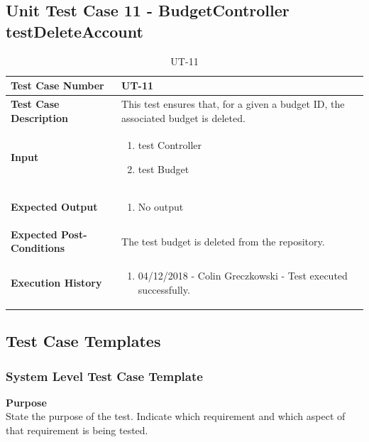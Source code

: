 \documentclass[12pt]{article}
\begin{document}
\subsection{Unit Test Case 11 - BudgetController testDeleteAccount}
\def\arraystretch{1.5}%
\begin{table}[htbp]
\centering
\caption{UT-11}
\label{UT-11}
\begin{tabularx}{\textwidth}{ | l | X |}
\hline
\textbf{Test Case Number}      		&  UT-11                 			\\ \hline
\textbf{Test Case Description}    	&  This test ensures that, for a given a budget ID, the associated budget is deleted. 				\\ \hline
\textbf{Input}         			& 	\begin{enumerate}
								\item test Controller
								\item test Budget
							\end{enumerate} 		\\ \hline
\textbf{Expected Output}     		& 	\begin{enumerate}
								\item No output
							\end{enumerate} 		\\ \hline
\textbf{Expected Post-Conditions}	& The test budget is deleted from the repository.             				\\ \hline
\textbf{Execution History}   		&  	\begin{enumerate}
								\item 04/12/2018 - Colin Greczkowski - Test executed successfully.
							\end {enumerate} \\ \hline
\end{tabularx}
\end{table}
\clearpage

\subsection{Test Case Templates}

\subsubsection{System Level Test Case Template}
\noindent
{\bf Purpose}\\
State the purpose of the test.
Indicate which requirement and which aspect of that requirement is being tested.
\end{document}
